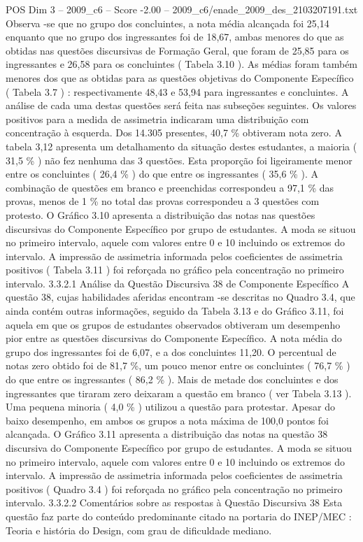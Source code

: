 \begin{textsample}{POS Dim 3 – 2009\_c6 – Score -2.00 – 2009\_c6/enade\_2009\_des\_2103207191.txt}
Observa -se que no grupo dos concluintes, a nota média alcançada foi 25,14 enquanto que no grupo dos ingressantes foi de 18,67, ambas menores do que as obtidas nas questões discursivas de Formação Geral, que foram de 25,85 para os ingressantes e 26,58 para os concluintes ( Tabela 3.10 ).
As médias foram também menores dos que as obtidas para as questões objetivas do Componente Específico ( Tabela 3.7 ) : respectivamente 48,43 e 53,94 para ingressantes e concluintes.
A análise de cada uma destas questões será feita nas subseções seguintes.
Os valores positivos para a medida de assimetria indicaram uma distribuição com concentração à esquerda.
Dos 14.305 presentes, 40,7 \% obtiveram nota zero.
A tabela 3,12 apresenta um detalhamento da situação destes estudantes, a maioria ( 31,5 \% ) não fez nenhuma das 3 questões.
Esta proporção foi ligeiramente menor entre os concluintes ( 26,4 \% ) do que entre os ingressantes ( 35,6 \% ).
A combinação de questões em branco e preenchidas correspondeu a 97,1 \% das provas, menos de 1 \% no total das provas correspondeu a 3 questões com protesto.
O Gráfico 3.10 apresenta a distribuição das notas nas questões discursivas do Componente Específico por grupo de estudantes.
A moda se situou no primeiro intervalo, aquele com valores entre 0 e 10 incluindo os extremos do intervalo.
A impressão de assimetria informada pelos coeficientes de assimetria positivos ( Tabela 3.11 ) foi reforçada no gráfico pela concentração no primeiro intervalo. 3.3.2.1 Análise da Questão Discursiva 38 de Componente Específico A questão 38, cujas habilidades aferidas encontram -se descritas no Quadro 3.4, que ainda contém outras informações, seguido da Tabela 3.13 e do Gráfico 3.11, foi aquela em que os grupos de estudantes observados obtiveram um desempenho pior entre as questões discursivas do Componente Específico.
A nota média do grupo dos ingressantes foi de 6,07, e a dos concluintes 11,20.
O percentual de notas zero obtido foi de 81,7 \%, um pouco menor entre os concluintes ( 76,7 \% ) do que entre os ingressantes ( 86,2 \% ).
Mais de metade dos concluintes e dos ingressantes que tiraram zero deixaram a questão em branco ( ver Tabela 3.13 ).
Uma pequena minoria ( 4,0 \% ) utilizou a questão para protestar.
Apesar do baixo desempenho, em ambos os grupos a nota máxima de 100,0 pontos foi alcançada.
O Gráfico 3.11 apresenta a distribuição das notas na questão 38 discursiva do Componente Específico por grupo de estudantes.
A moda se situou no primeiro intervalo, aquele com valores entre 0 e 10 incluindo os extremos do intervalo.
A impressão de assimetria informada pelos coeficientes de assimetria positivos ( Quadro 3.4 ) foi reforçada no gráfico pela concentração no primeiro intervalo. 3.3.2.2 Comentários sobre as respostas à Questão Discursiva 38 Esta questão faz parte do conteúdo predominante citado na portaria do INEP/MEC : Teoria e história do Design, com grau de dificuldade mediano.

\end{textsample}
